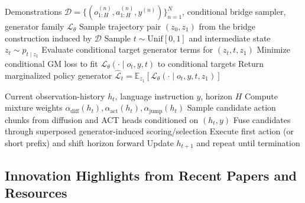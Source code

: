 \documentclass[
]{article}
\theoremstyle{remark}
\begin{document}
\begin{algorithm}[H]
\caption{Conditional Generator Matching for VLA Policy Learning}
\begin{algorithmic}[1]
\Require Demonstrations $\mathcal{D}=\{(o_{1:H}^{(n)},a_{1:H}^{(n)},y^{(n)})\}_{n=1}^N$, conditional bridge sampler, generator family $\mathcal{L}_\theta$
  \State Sample trajectory pair $(z_0,z_1)$ from the bridge construction induced by $\mathcal{D}$
  \State Sample $t\sim\mathrm{Unif}[0,1]$ and intermediate state $z_t\sim p_{t\mid z_1}$
  \State Evaluate conditional target generator terms for $(z_t,t,z_1)$
  \State Minimize conditional GM loss to fit $\mathcal{L}_\theta(\cdot\mid o_t,y,t)$ to conditional targets
\EndFor
\State Return marginalized policy generator $\widehat{\mathcal{L}}_t=\mathbb{E}_{z_1}[\mathcal{L}_\theta(\cdot\mid o_t,y,t,z_1)]$
\end{algorithmic}
\end{algorithm}

\begin{algorithm}[H]
\caption{Receding-Horizon Markov-Superposed Control (Diffusion + ACT)}
\begin{algorithmic}[1]
\Require Current observation-history $h_t$, language instruction $y$, horizon $H$
\State Compute mixture weights $\alpha_{\mathrm{diff}}(h_t),\alpha_{\mathrm{act}}(h_t),\alpha_{\mathrm{jump}}(h_t)$
\State Sample candidate action chunks from diffusion and ACT heads conditioned on $(h_t,y)$
\State Fuse candidates through superposed generator-induced scoring/selection
\State Execute first action (or short prefix) and shift horizon forward
\State Update $h_{t+1}$ and repeat until termination
\end{algorithmic}
\end{algorithm}

\subsection{Innovation Highlights from Recent Papers and Resources}
\end{document}
